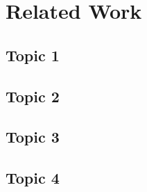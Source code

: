 
\section{Related Work}

\lipsum[1]


\subsection{Topic 1}

\lipsum[1-1]

\subsection{Topic 2}

\lipsum[1-1]

\subsection{Topic 3}

\lipsum[1-1]

\subsection{Topic 4}

\lipsum[1-1]